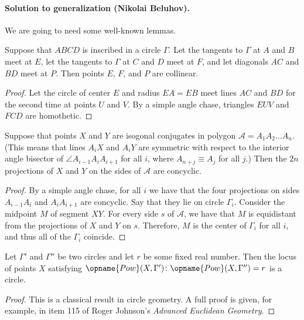 \documentclass[11pt]{scrartcl}
\begin{document}
\paragraph{Solution to generalization (Nikolai Beluhov).}
We are going to need some well-known lemmas.

\begin{lemma*}
Suppose that $ABCD$ is inscribed in a circle $\Gamma$.
Let the tangents to $\Gamma$ at $A$ and $B$ meet at $E$,
let the tangents to $\Gamma$ at $C$ and $D$ meet at $F$,
and let diagonals $AC$ and $BD$ meet at $P$.
Then points $E$, $F$, and $P$ are collinear.
\end{lemma*}

\begin{proof}
Let the circle of center $E$ and radius $EA = EB$
meet lines $AC$ and $BD$ for the second time at points $U$ and $V$.
By a simple angle chase, triangles $EUV$ and $FCD$ are homothetic.
\end{proof}

\begin{lemma*}
Suppose that points $X$ and $Y$ are isogonal conjugates
in polygon $\mathcal{A} = A_1A_2 \dots A_n$.
(This means that lines $A_iX$ and $A_iY$
are symmetric with respect to the interior angle bisector of
$\angle A_{i - 1}A_iA_{i + 1}$ for all $i$,
where $A_{n + j} \equiv A_j$ for all $j$.)
Then the $2n$ projections of $X$ and $Y$ on the sides of $\mathcal{A}$ are concyclic.
\end{lemma*}

\begin{proof}
By a simple angle chase, for all $i$ we have that
the four projections on sides
$A_{i - 1}A_i$ and $A_iA_{i + 1}$ are concyclic.
Say that they lie on circle $\Gamma_i$.
Consider the midpoint $M$ of segment $XY$.
For every side $s$ of $\mathcal{A}$,
we have that $M$ is equidistant from the projections of $X$ and $Y$ on $s$.
Therefore, $M$ is the center of $\Gamma_i$ for all $i$,
and thus all of the $\Gamma_i$ coincide.
\end{proof}

\begin{lemma*}
Let $\Gamma'$ and $\Gamma''$ be two circles
and let $r$ be some fixed real number.
Then the locus of points $X$ satisfying
$\opname{Pow}(X, \Gamma') \colon \opname{Pow}(X, \Gamma'') = r$
is a circle.
\end{lemma*}

\begin{proof}
This is a classical result in circle geometry.
A full proof is given, for example,
in item 115 of Roger Johnson's \emph{Advanced Euclidean Geometry}.
\end{proof}
\end{document}
